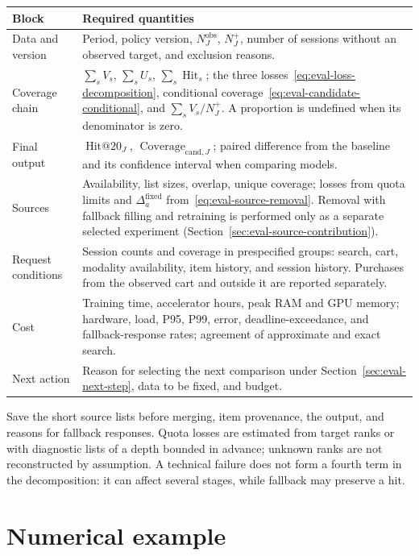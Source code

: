 \documentclass[12pt,a4paper]{article}
\theoremstyle{plainru}
\begin{document}
\begin{longtable}{L{0.25\textwidth}L{0.65\textwidth}}
\toprule Block & Required quantities \\\midrule\endhead
Data and version & Period, policy version, $N_J^{\mathrm{obs}}$, $N_J^+$,
number of sessions without an observed target, and exclusion reasons. \\
Coverage chain & $\sum_s V_s$, $\sum_s U_s$, $\sum_s\operatorname{Hit}_s$;
the three losses~\eqref{eq:eval-loss-decomposition},
conditional coverage~\eqref{eq:eval-candidate-conditional}, and $\sum_s V_s/N_J^+$.
A proportion is undefined when its denominator is zero. \\
Final output & $\operatorname{Hit@20}_J$,
$\operatorname{Coverage}_{\mathrm{cand},J}$; paired difference from the baseline
and its confidence interval when comparing models. \\
Sources & Availability, list sizes, overlap, unique coverage;
losses from quota limits and $\Delta_a^{\mathrm{fixed}}$
from~\eqref{eq:eval-source-removal}. Removal with fallback filling
and retraining is performed only as a separate selected experiment
(Section~\ref{sec:eval-source-contribution}). \\
Request conditions & Session counts and coverage in prespecified groups:
search, cart, modality availability, item history, and session history.
Purchases from the observed cart and outside it are reported separately. \\
Cost & Training time, accelerator hours, peak RAM
and GPU memory; hardware, load, P95, P99, error,
deadline-exceedance, and fallback-response rates; agreement of approximate and exact search. \\
Next action & Reason for selecting the next comparison
under Section~\ref{sec:eval-next-step}, data to be fixed, and budget. \\
\bottomrule
\end{longtable}

Save the short source lists before merging, item provenance,
the output, and reasons for fallback responses. Quota losses are estimated
from target ranks or with diagnostic lists of a depth bounded
in advance; unknown ranks are not reconstructed by assumption.
A technical failure does not form a fourth term in the decomposition:
it can affect several stages, while fallback may preserve a hit.

\section{Numerical example}\label{app:example}
\end{document}
